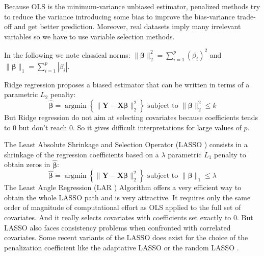 \documentclass[11pt,a4paper]{article}
\begin{document}
	Because \textsc{OLS} is the minimum-variance unbiased estimator, penalized methods try to reduce the variance introducing some bias to improve the bias-variance trade-off and get better prediction.
Moreover, real datasets imply many irrelevant variables so we have to use variable selection methods.

In the following we note classical norms: $\parallel\boldsymbol{\beta}\parallel_2^2=\sum_{i=1}^p(\beta_i)^2$ and $\parallel\boldsymbol{\beta} \parallel_1=\sum_{i=1}^p|\beta_i| $.

	Ridge regression\cite{marquardt1975ridge} proposes a biased estimator that can be written in terms of a parametric $L_2$ penalty:
	\begin{equation}
		 \boldsymbol{\hat{\beta}}=\operatorname{argmin} \left\lbrace \parallel \boldsymbol{Y}-\boldsymbol{X\beta}\parallel_2^2 \right\rbrace \textrm{ subject to } \parallel \boldsymbol{\beta} \parallel_2^2\leq k
	\end{equation}
	But Ridge regression do not aim at selecting covariates because coefficients tends to 0 but don't reach 0.
	So it gives difficult interpretations for large values of $p$.	
	
	
	The Least Absolute Shrinkage and Selection Operator (\textsc{LASSO} \cite{tibshirani1996regression}) consists in a shrinkage of the regression coefficients based on a $\lambda$ parametric $L_1$ penalty to obtain zeros in $\hat{\boldsymbol{\beta}}$:
		\begin{equation}
		 \boldsymbol{\hat{\beta}}=\operatorname{argmin} \left\lbrace \parallel \boldsymbol{Y}-\boldsymbol{X\beta}\parallel_2^2 \right\rbrace \textrm{ subject to } \parallel\boldsymbol{\beta} \parallel_1\leq \lambda
		\end{equation}	
	 The Least Angle Regression (\textsc{LAR} \cite{efron2004least}) Algorithm offers a very efficient way to obtain the whole LASSO path and is very attractive. It requires only the same order of magnitude of computational effort as \textsc{OLS} applied to the full set of covariates. And it  really selects covariates with coefficients set exactly to 0.
	 But \textsc{LASSO} also faces consistency problems \cite{Zhao2006MSC} when confronted  with correlated covariates. 
	 Some recent variants of the \textsc{LASSO} does exist for the choice of the penalization coefficient like the adaptative \textsc{LASSO} \cite{zou2006adaptive} or the random \textsc{LASSO} \cite{wang2011random}.
	 \\
	 
\end{document}
